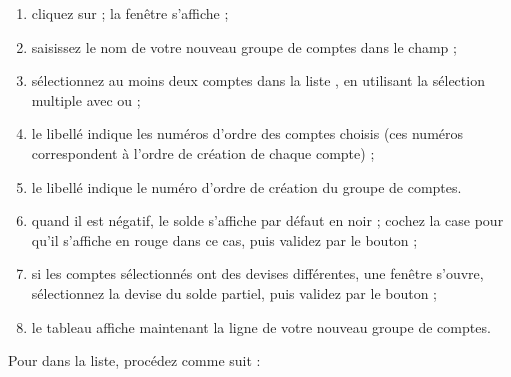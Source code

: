 \begin{enumerate}
	\item cliquez sur  ; la fenêtre  s'affiche ;
	\item saisissez le nom de votre nouveau groupe de comptes dans le champ  ;
	\item sélectionnez au moins deux comptes dans la liste , en utilisant la sélection multiple avec  ou   ; 
 	\item le libellé  indique les numéros d'ordre des comptes choisis (ces numéros correspondent à l'ordre de création de chaque compte) ;
	\item le libellé  indique le numéro d'ordre de création du groupe de comptes.
	\item quand il est négatif, le solde s'affiche par défaut en noir{\couleur} ; cochez la case  pour qu'il s'affiche en rouge{\couleur} dans ce cas,  puis validez par le bouton  ;
	\item si les comptes sélectionnés ont des devises différentes, une fenêtre s'ouvre, sélectionnez la devise du solde partiel, puis validez par le bouton  ;
	\item le tableau  affiche maintenant la ligne de votre nouveau groupe de comptes. 
\end{enumerate}

Pour  dans la liste, procédez comme suit :

